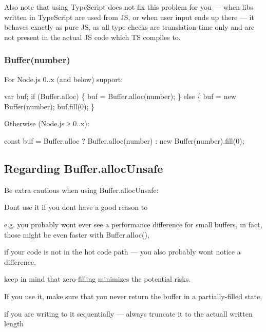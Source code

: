 Also note that using Type\+Script does not fix this problem for you — when libs written in {\ttfamily Type\+Script} are used from JS, or when user input ends up there — it behaves exactly as pure JS, as all type checks are translation-\/time only and are not present in the actual JS code which TS compiles to.

\subsubsection*{Buffer(number)}

For Node.\+js 0..\+x (and below) support\+:


\begin{DoxyCode}
var buf;
if (Buffer.alloc) \{
  buf = Buffer.alloc(number);
\} else \{
  buf = new Buffer(number);
  buf.fill(0);
\}
\end{DoxyCode}


Otherwise (Node.\+js ≥ 0..\+x)\+:


\begin{DoxyCode}
const buf = Buffer.alloc ? Buffer.alloc(number) : new Buffer(number).fill(0);
\end{DoxyCode}


\subsection*{Regarding Buffer.\+alloc\+Unsafe}

Be extra cautious when using {\ttfamily Buffer.\+alloc\+Unsafe}\+:
\begin{DoxyItemize}
\item Don\textquotesingle{}t use it if you don\textquotesingle{}t have a good reason to
\begin{DoxyItemize}
\item e.\+g. you probably won\textquotesingle{}t ever see a performance difference for small buffers, in fact, those might be even faster with {\ttfamily Buffer.\+alloc()},
\item if your code is not in the hot code path — you also probably won\textquotesingle{}t notice a difference,
\item keep in mind that zero-\/filling minimizes the potential risks.
\end{DoxyItemize}
\item If you use it, make sure that you never return the buffer in a partially-\/filled state,
\begin{DoxyItemize}
\item if you are writing to it sequentially — always truncate it to the actuall written length
\end{DoxyItemize}
\end{DoxyItemize}

